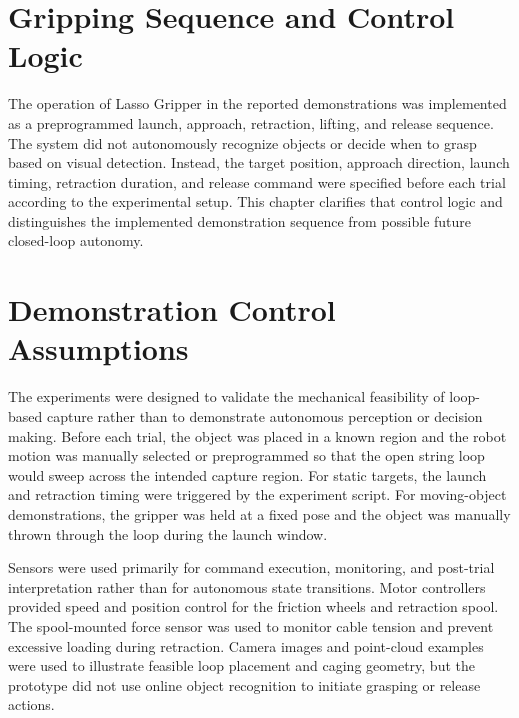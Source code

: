 \section{{Gripping Sequence and Control Logic} }
\label{Chapter4} %
The operation of Lasso Gripper in the reported demonstrations was implemented as a preprogrammed launch, approach, retraction, lifting, and release sequence. The system did not autonomously recognize objects or decide when to grasp based on visual detection. Instead, the target position, approach direction, launch timing, retraction duration, and release command were specified before each trial according to the experimental setup. This chapter clarifies that control logic and distinguishes the implemented demonstration sequence from possible future closed-loop autonomy.

\section{Demonstration Control Assumptions}
The experiments were designed to validate the mechanical feasibility of loop-based capture rather than to demonstrate autonomous perception or decision making. Before each trial, the object was placed in a known region and the robot motion was manually selected or preprogrammed so that the open string loop would sweep across the intended capture region. For static targets, the launch and retraction timing were triggered by the experiment script. For moving-object demonstrations, the gripper was held at a fixed pose and the object was manually thrown through the loop during the launch window.

Sensors were used primarily for command execution, monitoring, and post-trial interpretation rather than for autonomous state transitions. Motor controllers provided speed and position control for the friction wheels and retraction spool. The spool-mounted force sensor was used to monitor cable tension and prevent excessive loading during retraction. Camera images and point-cloud examples were used to illustrate feasible loop placement and caging geometry, but the prototype did not use online object recognition to initiate grasping or release actions.

